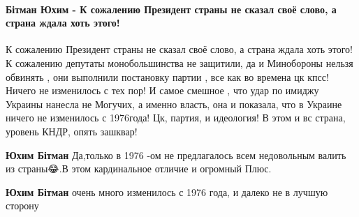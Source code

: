  
 
 
 
 

\paragraph{Бітман Юхим - К сожалению Президент страны не сказал своё слово, а страна ждала хоть этого!}

\begin{itemize}
 
К сожалению Президент страны не сказал своё слово, а страна ждала хоть этого!
К сожалению депутаты монобольшинства не защитили, да и Минобороны нельзя
обвинять , они выполнили постановку партии , все как во времена цк кпсс! Ничего
не изменилось с тех пор! И самое смешное , что удар по имиджу Украины нанесла
не Могучих, а именно власть, она и показала, что в Украине ничего не изменилось
с 1976года! Цк, партия, и идеология! В этом и вс страна, уровень КНДР, опять
зашквар!

\begin{itemize}
 
\textbf{Юхим Бітман} Да,только в 1976 -ом не предлагалось всем недовольным валить из страны😂.В этом кардинальное отличие и огромный Плюс.🧐

 
\textbf{Юхим Бітман} очень много изменилось с 1976 года, и далеко не в лучшую сторону


\end{itemize}
\end{itemize}
